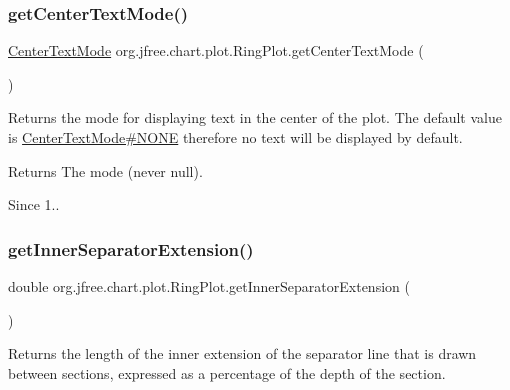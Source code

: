 \subsubsection{\texorpdfstring{get\+Center\+Text\+Mode()}{getCenterTextMode()}}
{\footnotesize\ttfamily \mbox{\hyperlink{enumorg_1_1jfree_1_1chart_1_1plot_1_1_center_text_mode}{Center\+Text\+Mode}} org.\+jfree.\+chart.\+plot.\+Ring\+Plot.\+get\+Center\+Text\+Mode (\begin{DoxyParamCaption}{ }\end{DoxyParamCaption})}

Returns the mode for displaying text in the center of the plot. The default value is \mbox{\hyperlink{enumorg_1_1jfree_1_1chart_1_1plot_1_1_center_text_mode_a8ff0c6edb9367518b9a55b176965a4db}{Center\+Text\+Mode\#\+N\+O\+NE}} therefore no text will be displayed by default.

\begin{DoxyReturn}{Returns}
The mode (never {\ttfamily null}).
\end{DoxyReturn}
\begin{DoxySince}{Since}
1.. 
\end{DoxySince}
\mbox{\label{classorg_1_1jfree_1_1chart_1_1plot_1_1_ring_plot_af94bba1ac45b66d27c45ba268e0c63ee}} 
\subsubsection{\texorpdfstring{get\+Inner\+Separator\+Extension()}{getInnerSeparatorExtension()}}
{\footnotesize\ttfamily double org.\+jfree.\+chart.\+plot.\+Ring\+Plot.\+get\+Inner\+Separator\+Extension (\begin{DoxyParamCaption}{ }\end{DoxyParamCaption})}

Returns the length of the inner extension of the separator line that is drawn between sections, expressed as a percentage of the depth of the section.

